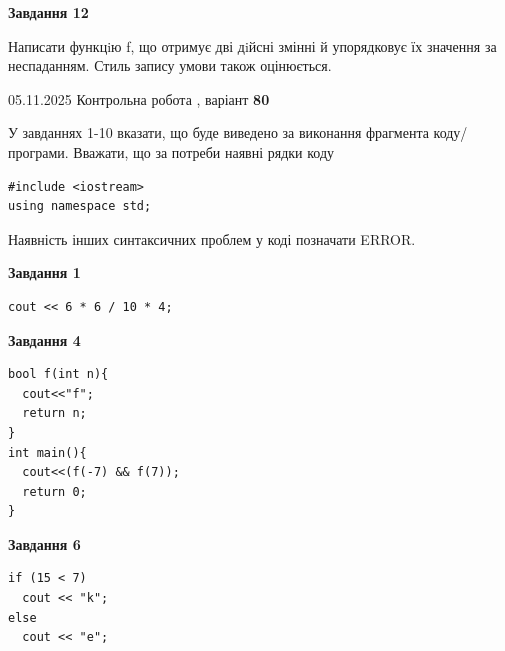 \documentclass[12pt, ukrainian]{article}
\begin{document}
{\begin {large}
\begin{minipage}[t]{11.0cm}
\begin{center}
\textbf{Завдання 12}
\end{center}

Написати функцiю f, що отримує дві дiйсні змінні й упорядковує їх значення за неспаданням. Стиль запису умови також оцінюється.\par

\end{minipage}

\end {large}}
\newpage

{\Large{05.11.2025 Контрольна робота , варіант  \No \textbf { 80 }\par}}
{
\begin {large}
У завданнях 1-10 вказати, що буде виведено за виконання фрагмента коду/про\-гра\-ми.
Вважати, що за потреби наявні рядки коду
\begin{verbatim}
#include <iostream>
using namespace std;
\end{verbatim}
Наявність інших синтаксичних проблем у коді позначати ERROR.

\begin{minipage}[t]{7.0cm}

\begin{center}
\textbf{Завдання 1}
\end{center}
\vspace{-8mm}

\begin{verbatim}
cout << 6 * 6 / 10 * 4;
\end{verbatim}



\begin{center}
\textbf{Завдання 4}
\end{center}
\vspace{-8mm}

\begin{verbatim}
bool f(int n){
  cout<<"f";
  return n;
}
int main(){
  cout<<(f(-7) && f(7));
  return 0;
}
\end{verbatim}



\begin{center}
\textbf{Завдання 6}
\end{center}
\vspace{-8mm}

\begin{verbatim}
if (15 < 7)
  cout << "k";
else
  cout << "e";
\end{verbatim}




\end{minipage}
\end{large}}
\end{document}
